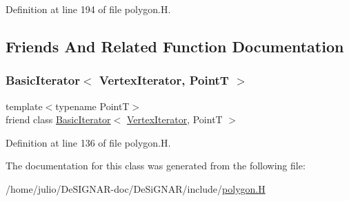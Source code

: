 Definition at line 194 of file polygon.\+H.



\subsection{Friends And Related Function Documentation}
\mbox{\label{class_designar_1_1_gen_polygon_1_1_vertex_iterator_a580630487e8bbe9b1152cc636325bee6}} 
\subsubsection{\texorpdfstring{Basic\+Iterator$<$ Vertex\+Iterator, Point\+T $>$}{BasicIterator< VertexIterator, PointT >}}
{\footnotesize\ttfamily template$<$typename PointT$>$ \\
friend class \hyperlink{class_designar_1_1_basic_iterator}{Basic\+Iterator}$<$ \hyperlink{class_designar_1_1_gen_polygon_1_1_vertex_iterator}{Vertex\+Iterator}, PointT $>$\hspace{0.3cm}{\ttfamily [friend]}}



Definition at line 136 of file polygon.\+H.



The documentation for this class was generated from the following file\+:\begin{DoxyCompactItemize}
\item 
/home/julio/\+De\+S\+I\+G\+N\+A\+R-\/doc/\+De\+Si\+G\+N\+A\+R/include/\hyperlink{polygon_8_h}{polygon.\+H}\end{DoxyCompactItemize}
